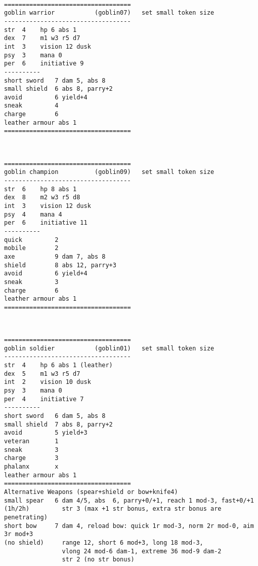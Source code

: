 \

\goodbreak \begin{samepage} \small \begin{verbatim}
===================================
goblin warrior           (goblin07)   set small token size
-----------------------------------
str  4    hp 6 abs 1
dex  7    m1 w3 r5 d7
int  3    vision 12 dusk
psy  3    mana 0
per  6    initiative 9
----------
short sword   7 dam 5, abs 8
small shield  6 abs 8, parry+2
avoid         6 yield+4
sneak         4
charge        6
leather armour abs 1
===================================
\end{verbatim} \normalsize \end{samepage}

\

\goodbreak \begin{samepage} \small \begin{verbatim}
===================================
goblin champion          (goblin09)   set small token size
-----------------------------------
str  6    hp 8 abs 1
dex  8    m2 w3 r5 d8
int  3    vision 12 dusk
psy  4    mana 4
per  6    initiative 11
----------
quick         2
mobile        2
axe           9 dam 7, abs 8
shield        8 abs 12, parry+3
avoid         6 yield+4
sneak         3
charge        6
leather armour abs 1
===================================
\end{verbatim} \normalsize \end{samepage}

\

\goodbreak \begin{samepage} \small \begin{verbatim}
===================================
goblin soldier           (goblin01)   set small token size
-----------------------------------
str  4    hp 6 abs 1 (leather)
dex  5    m1 w3 r5 d7
int  2    vision 10 dusk
psy  3    mana 0
per  4    initiative 7
----------
short sword   6 dam 5, abs 8
small shield  7 abs 8, parry+2
avoid         5 yield+3
veteran       1
sneak         3
charge        3
phalanx       x
leather armour abs 1
===================================
Alternative Weapons (spear+shield or bow+knife4)
small spear   6 dam 4/5, abs  6, parry+0/+1, reach 1 mod-3, fast+0/+1
(1h/2h)         str 3 (max +1 str bonus, extra str bonus are penetrating)
short bow     7 dam 4, reload bow: quick 1r mod-3, norm 2r mod-0, aim 3r mod+3
(no shield)     range 12, short 6 mod+3, long 18 mod-3,
                vlong 24 mod-6 dam-1, extreme 36 mod-9 dam-2
                str 2 (no str bonus)
\end{verbatim} \normalsize \end{samepage}

